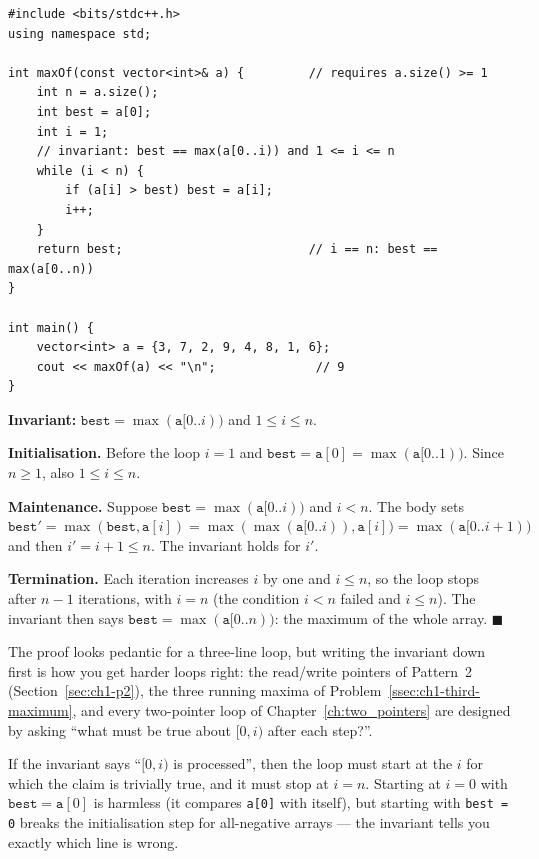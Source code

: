 \begin{lstlisting}[style=cpp]
#include <bits/stdc++.h>
using namespace std;

int maxOf(const vector<int>& a) {         // requires a.size() >= 1
    int n = a.size();
    int best = a[0];
    int i = 1;
    // invariant: best == max(a[0..i)) and 1 <= i <= n
    while (i < n) {
        if (a[i] > best) best = a[i];
        i++;
    }
    return best;                          // i == n: best == max(a[0..n))
}

int main() {
    vector<int> a = {3, 7, 2, 9, 4, 8, 1, 6};
    cout << maxOf(a) << "\n";              // 9
}
\end{lstlisting}

\begin{invariantbox}
\textbf{Invariant:} $\texttt{best} = \max(\texttt{a}[0..i))$ and $1 \le i \le n$.

\textbf{Initialisation.} Before the loop $i = 1$ and $\texttt{best} = \texttt{a}[0] = \max(\texttt{a}[0..1))$. Since $n \ge 1$, also $1 \le i \le n$.

\textbf{Maintenance.} Suppose $\texttt{best} = \max(\texttt{a}[0..i))$ and $i < n$. The body sets $\texttt{best}' = \max(\texttt{best}, \texttt{a}[i]) = \max(\max(\texttt{a}[0..i)), \texttt{a}[i]) = \max(\texttt{a}[0..i+1))$ and then $i' = i + 1 \le n$. The invariant holds for $i'$.

\textbf{Termination.} Each iteration increases $i$ by one and $i \le n$, so the loop stops after $n - 1$ iterations, with $i = n$ (the condition $i < n$ failed and $i \le n$). The invariant then says $\texttt{best} = \max(\texttt{a}[0..n))$: the maximum of the whole array. \hfill$\blacksquare$
\end{invariantbox}

The proof looks pedantic for a three-line loop, but writing the invariant down first is how you get harder loops right: the read/write pointers of Pattern~2 (Section~\ref{sec:ch1-p2}), the three running maxima of Problem~\ref{ssec:ch1-third-maximum}, and every two-pointer loop of Chapter~\ref{ch:two_pointers} are designed by asking ``what must be true about $[0, i)$ after each step?''.

\begin{insightbox}
If the invariant says ``$[0, i)$ is processed'', then the loop must start at the $i$ for which the claim is trivially true, and it must stop at $i = n$. Starting at $i = 0$ with $\texttt{best} = \texttt{a}[0]$ is harmless (it compares \texttt{a[0]} with itself), but starting with \texttt{best = 0} breaks the initialisation step for all-negative arrays --- the invariant tells you exactly which line is wrong.
\end{insightbox}

